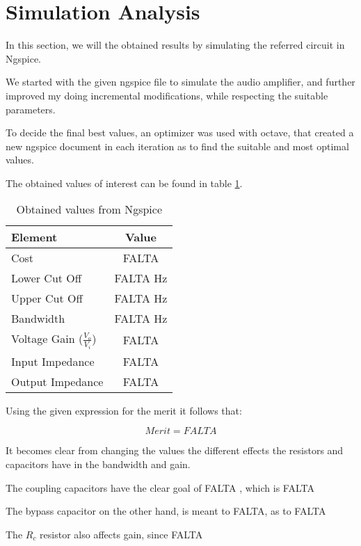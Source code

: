 \newpage

\section{Simulation Analysis}
\label{sec:simulation}

In this section, we will the obtained results by simulating the referred circuit in Ngspice. 

We started with the given ngspice file to simulate the audio amplifier, and further improved my doing incremental modifications, while respecting the suitable parameters.

To decide the final best values, an optimizer was used with octave, that created a new ngspice document in each iteration as to find the suitable and most optimal values.

The obtained values of interest can be found in table \ref{tab:sim1}.

\begin{table}[h]
    \centering
    \begin{tabular}{|l|c|}
    \hline
    {\bf Element } & {\bf Value} \\
    \hline \hline
    Cost & FALTA \\
    \hline
    Lower Cut Off & FALTA Hz\\
    \hline
    Upper Cut Off & FALTA Hz \\
    \hline
    Bandwidth & FALTA Hz \\
    \hline
    Voltage Gain ($\frac{V_{o}}{V_{i}}$)  & FALTA \\
    \hline
    Input Impedance & FALTA \\
    \hline
    Output Impedance & FALTA \\
    \hline 
    \end{tabular}
    \caption{Obtained values from Ngspice}
    \label{tab:sim1}
\end{table}


Using the given expression for the merit it follows that:

\begin{equation}
    Merit = FALTA 
    \label{eq:merit}
\end{equation}

It becomes clear from changing the values the different effects the resistors and capacitors have in the bandwidth and gain.

The coupling capacitors have the clear goal of FALTA , which is FALTA

The bypass capacitor on the other hand, is meant to FALTA, as to FALTA

The $R_c$ resistor also affects gain, since FALTA


